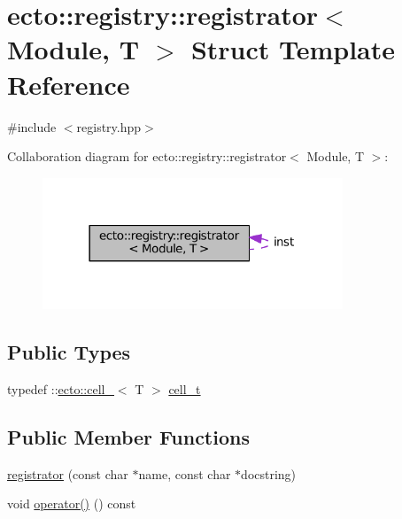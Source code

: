 \hypertarget{structecto_1_1registry_1_1registrator}{}\section{ecto\+:\+:registry\+:\+:registrator$<$ Module, T $>$ Struct Template Reference}
\label{structecto_1_1registry_1_1registrator}


{\ttfamily \#include $<$registry.\+hpp$>$}



Collaboration diagram for ecto\+:\+:registry\+:\+:registrator$<$ Module, T $>$\+:\nopagebreak
\begin{figure}[H]
\begin{center}
\leavevmode
\includegraphics[width=254pt]{structecto_1_1registry_1_1registrator__coll__graph}
\end{center}
\end{figure}
\subsection*{Public Types}
\begin{DoxyCompactItemize}
\item 
typedef \+::\hyperlink{structecto_1_1cell__}{ecto\+::cell\+\_\+}$<$ T $>$ \hyperlink{structecto_1_1registry_1_1registrator_ae352ebfb18c87dc7fb3f649ecbe445fa}{cell\+\_\+t}
\end{DoxyCompactItemize}
\subsection*{Public Member Functions}
\begin{DoxyCompactItemize}
\item 
\hyperlink{structecto_1_1registry_1_1registrator_a3c8bafa2e65ef88c572c1779fb05fd12}{registrator} (const char $\ast$name, const char $\ast$docstring)
\item 
void \hyperlink{structecto_1_1registry_1_1registrator_a11572913b91238e8d6415bb89cc7ac1a}{operator()} () const 
\end{DoxyCompactItemize}

